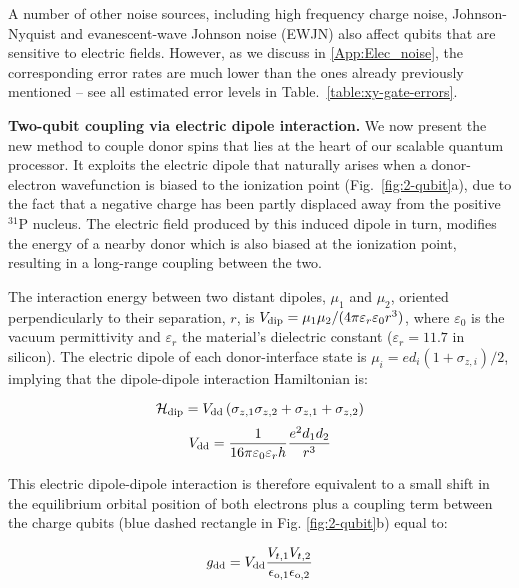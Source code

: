 \documentclass[aps,prb,superscriptaddress,nobibnotes,twocolumn]{revtex4-1}
\begin{document}
A number of other noise sources, including high frequency charge noise, Johnson-Nyquist and evanescent-wave Johnson noise \cite{Henkel1999} (EWJN) also affect qubits that are sensitive to electric fields. However, as we discuss in \ref{App:Elec_noise}, the corresponding error rates are much lower than the ones already previously mentioned -- see all estimated error levels in Table.~\ref{table:xy-gate-errors}.


\vspace{3mm}
\noindent\textbf{Two-qubit coupling via electric dipole interaction.}
%
We now present the new method to couple donor spins that lies at the heart of our scalable quantum processor. It exploits the electric dipole that naturally arises when a donor-electron wavefunction is biased to the ionization point (Fig.~\ref{fig:2-qubit}a), due to the fact that a negative charge has been partly displaced away from the positive $^{31}$P nucleus. The electric field produced by this induced dipole in turn, modifies the energy of a nearby donor which is also biased at the ionization point, resulting in a long-range coupling between the two.

The interaction energy between two distant dipoles, $\mu_1$ and $\mu_2$, oriented perpendicularly to their separation, $r$, is \cite{Ravets2014} $V_{\rm dip}=\mu_1\mu_2/(4\pi\varepsilon_r\varepsilon_0r^3)$, where $\varepsilon_0$ is the vacuum permittivity and $\varepsilon_r$ the material's dielectric constant ($\varepsilon_r=11.7$ in silicon). The electric dipole of each donor-interface state is $\mu_i=ed_i(1+\sigma_{z,i})/2$, implying that the dipole-dipole interaction Hamiltonian is:

\begin{equation} \label{eq:H_dipdip}
\mathcal{H}_{\rm dip}=V_{\rm dd}\left(\sigma_{z,1}\sigma_{z,2}+\sigma_{z,1}+\sigma_{z,2}\right)
\end{equation}
\begin{equation} \label{eq:V_dd}
V_{\rm dd}=\frac{1}{16\pi\varepsilon_0\varepsilon_r h}\frac{e^2d_1 d_2}{r^3}
\end{equation}

This electric dipole-dipole interaction is therefore equivalent to a small shift in the equilibrium orbital position of both electrons plus a coupling term between the charge qubits (blue dashed rectangle in Fig. \ref{fig:2-qubit}b) equal to:

\begin{equation} \label{eq:g_dd}
g_{\rm dd}=V_{\rm dd}\frac{V_{t,1}V_{t,2}}{\epsilon_{\rm o,1}\epsilon_{\rm o,2}}
\end{equation}
\end{document}
